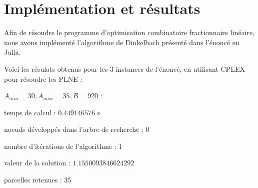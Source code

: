 \documentclass[12pt]{article}
\begin{document}
\section{Implémentation et résultats}

\noindent Afin de résoudre le programme d'optimisation combinatoire fractionnaire linéaire, nous avons implémenté l'algorithme de Dinkelbach présenté dans l'énoncé en Julia.

\medskip

\noindent Voici les résulats obtenus pour les 3 instances de l'énoncé, en utilisant CPLEX pour résoudre les PLNE :

\begin{arrowlist}
    \item $A_{min} = 30, A_{max} = 35, B = 920$ :
    \begin{bulletlist}
        \item temps de calcul : $0.449146576$ s
        \item noeuds développés dans l'arbre de recherche : 0
        \item nombre d'itérations de l'algorithme : 1
        \item valeur de la solution : $1.1550093846624292$
        \item parcelles retenues : 35
        \begin{center}
\end{center}
\end{bulletlist}
\end{arrowlist}
\end{document}
